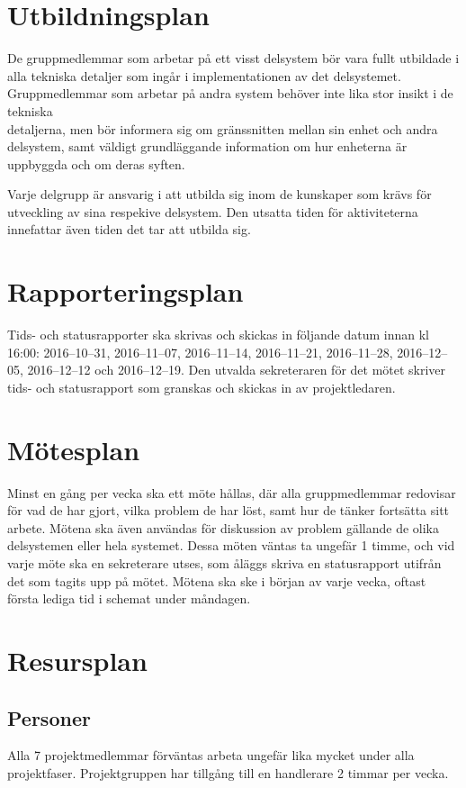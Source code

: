 \documentclass[a4paper,titlepage,12pt]{article}
\begin{document}
	\section{Utbildningsplan}

	De gruppmedlemmar som arbetar på ett visst delsystem bör vara fullt
	utbildade i alla tekniska detaljer som ingår i implementationen av det
	delsystemet. Gruppmedlemmar som arbetar på andra system behöver inte lika
	stor insikt i de tekniska \\ detaljerna, men bör
	informera sig om gränssnitten mellan sin enhet och andra delsystem, samt väldigt 
	grundläggande information om hur enheterna är uppbyggda och om deras syften.

	Varje delgrupp är ansvarig i att utbilda sig inom de kunskaper som krävs
	för utveckling av sina respekive delsystem. Den utsatta tiden för
	aktiviteterna innefattar även tiden det tar att utbilda sig. 

	\section{Rapporteringsplan}
	Tids- och statusrapporter ska skrivas och skickas in följande datum innan kl 16:00: 
    2016--10--31, 2016--11--07, 2016--11--14, 2016--11--21, 2016--11--28, 2016--12--05, 
    2016--12--12 och 2016--12--19. Den utvalda sekreteraren för det mötet skriver tids-
    och statusrapport som granskas och skickas in av projektledaren. 
	
	\section{Mötesplan}
	Minst en gång per vecka ska ett möte hållas, där alla gruppmedlemmar
	redovisar för vad de har gjort, vilka problem de har löst, samt hur de
	tänker fortsätta sitt arbete. Mötena ska även användas för diskussion av
	problem gällande de olika delsystemen eller hela systemet. Dessa möten väntas 
	ta ungefär 1 timme, och vid varje möte ska en sekreterare utses, som åläggs skriva 
	en statusrapport utifrån det som tagits upp på mötet. Mötena ska ske i början av
	varje vecka, oftast första lediga tid i schemat under måndagen.
	
	\section{Resursplan}
  
	\subsection{Personer}
	Alla 7 projektmedlemmar förväntas arbeta ungefär lika mycket under alla
	projektfaser. Projektgruppen har tillgång till en handlerare 2 timmar per vecka. 
	
\end{document}

